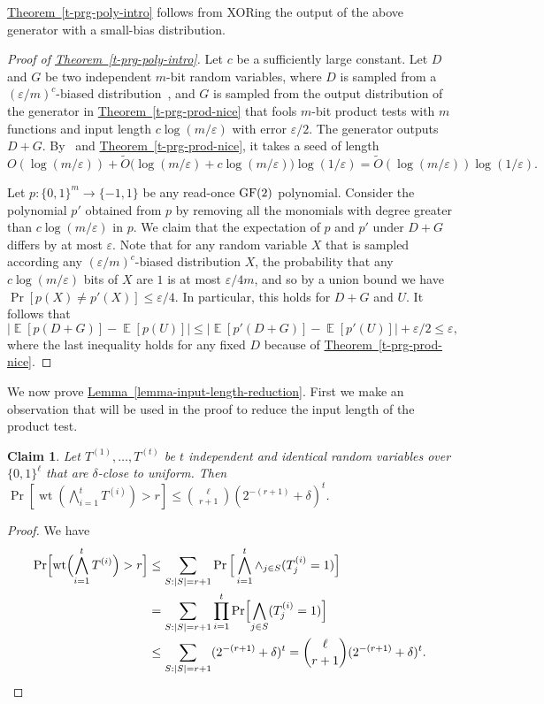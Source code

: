 \documentclass[11pt]{article}
\numberwithin{equation}{section}
\newtheorem{claim}[theorem]{Claim}
\theoremstyle{definition}
\theoremstyle{plain}
\newcommand{\expref}[2]{\hyperref[#2]{#1~\ref{#2}}}
\newcommand{\zo}{\{0,1\}}
\def\eps{\varepsilon}
\def\pmone{\{-1, 1\}}
\def\Blocklength{\ell}
\DeclarePairedDelimiter{\abs}{\lvert}{\rvert}
\DeclareMathOperator{\wtt}{wt}  %
\DeclareMathOperator*{\E}{\mathbb{E}}                 %
\begin{document}
	\expref{Theorem}{t-prg-poly-intro} follows from XORing the output of the above generator with a small-bias distribution.

 \begin{proof}[Proof of {\expref{Theorem}{t-prg-poly-intro}}]
    Let $c$ be a sufficiently large constant.
    Let $D$ and $G$ be two independent $m$-bit random variables, where
    $D$ is 
    sampled from a $(\eps / m)^c$-biased distribution~\cite{NaorN93},
    and $G$ 
    is
    sampled from the output distribution of the generator in \expref{Theorem}{t-prg-prod-nice} that fools 
    $m$-bit  %
    product tests with $m$ functions and input length $c \log (m/\eps)$ with error $\eps/2$.
		The generator outputs $D + G$.
		By~\cite{NaorN93} and \expref{Theorem}{t-prg-prod-nice}, it takes a seed of length
		\[
			O(\log(m/\eps)) + \tilde O \bigl( \log(m/\eps) + c\log(m/\eps) \bigr) \log(1/\eps)
			= \tilde O(\log(m/\eps)) \log(1/\eps) .
		\]

    Let $p\colon \zo^m \to \pmone$ be any read-once $\textnormal{GF}(2)$ polynomial.
    Consider the polynomial $p'$ obtained from $p$ by removing all the monomials with degree greater than $c \log(m/\eps)$ in $p$.
		We claim that the expectation of $p$ and $p'$ under $D + G$ differs by at most $\eps$.
		Note that for any random variable $X$ that is sampled according any $(\eps/m)^c$-biased distribution $X$, the probability that any $c\log(m/\eps)$ bits of $X$ are $1$ is at most $\eps/4m$, and so by a union bound we have $\Pr[p(X) \neq p'(X)] \le \eps / 4$.
		In particular, this holds for $D + G$ and $U$.
    It follows that 
		\[
			\bigl| \E[p(D + G)] - \E[p(U)] \bigr|
			\le \bigl| \E[p'(D + G)] - \E[p'(U)] \bigr| + \eps / 2
			\le \eps, 
		\]
		where the last inequality holds for any fixed $D$ because of \expref{Theorem}{t-prg-prod-nice}.
  \end{proof}

  We now prove \expref{Lemma}{lemma-input-length-reduction}.
  First we
%
make an observation  %
that will be used in the proof to reduce the input length of the product test.
	
	\begin{claim} \label{claim-shrink-termwise}
	  Let $T^{(1)}, \ldots, T^{(t)}$ be $t$ independent and identical random variables over $\zo^\Blocklength$ that are $\delta$-close to uniform.
    Then $\Pr[\wtt(\bigwedge_{i=1}^t T^{(i)}) > r] \le \binom{\Blocklength}{r + 1} (2^{-(r+1)} + \delta)^t$.  %
	\end{claim}
  \begin{proof}%
    We have
		\begin{align*}
      \Pr \Bigl[ \wtt\Bigl(\bigwedge_{i=1}^t T^{(i)}\Bigr) > r \Bigr]
			&\le \sum_{S: \abs{S} = r+1} \Pr \Big[ \bigwedge_{i=1}^t \wedge_{j \in S} (T^{(i)}_j = 1) \Big] \\
			&= \sum_{S: \abs{S} = r+1} \prod_{i=1}^t \Pr \Bigl[ \bigwedge_{j \in S} (T^{(i)}_j = 1) \Bigr] \\
			&\le \sum_{S: \abs{S} = r+1} (2^{-(r+1)} + \delta)^t = \binom{\Blocklength}{r+1} (2^{-(r+1)} + \delta)^t . \qedhere
		\end{align*}
  \end{proof}
\end{document}
